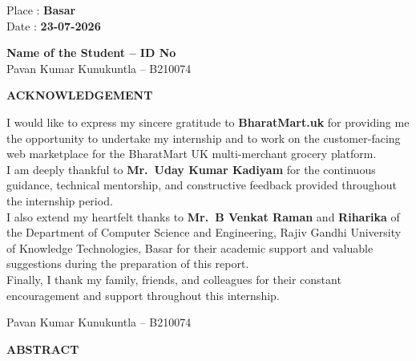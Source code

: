 \documentclass[12pt,a4paper]{report}
\begin{document}
\noindent
\begin{minipage}[t]{0.5\textwidth}
    \begin{flushleft}
        Place : \textbf{Basar} \\[0.8cm]
        Date : \textbf{23-07-2026}
    \end{flushleft}
\end{minipage}%
\begin{minipage}[t]{0.5\textwidth}
    \begin{flushright}
        \textbf{Name of the Student -- ID No} \\[0.2cm]
        Pavan Kumar Kunukuntla -- B210074
    \end{flushright}
\end{minipage}
\newpage


\newpage
{}
\begin{center}
    \textbf{\Large ACKNOWLEDGEMENT} \\[1.5cm]
\end{center}

\noindent I would like to express my sincere gratitude to \textbf{BharatMart.uk} for providing me the opportunity to undertake my internship and to work on the customer-facing web marketplace for the BharatMart UK multi-merchant grocery platform. \\[0.5cm]

\noindent I am deeply thankful to \textbf{Mr.\ Uday Kumar Kadiyam} for the continuous guidance, technical mentorship, and constructive feedback provided throughout the internship period. \\[0.5cm]

\noindent I also extend my heartfelt thanks to \textbf{Mr.\ B Venkat Raman} and \textbf{Riharika} of the Department of Computer Science and Engineering, Rajiv Gandhi University of Knowledge Technologies, Basar for their academic support and valuable suggestions during the preparation of this report. \\[0.5cm]

\noindent Finally, I thank my family, friends, and colleagues for their constant encouragement and support throughout this internship. \\[2cm]

\begin{flushright}
    Pavan Kumar Kunukuntla -- B210074
\end{flushright}


\newpage
{}
\begin{center}
    \textbf{\Large ABSTRACT} \\[1.5cm]
\end{center}
\end{document}
